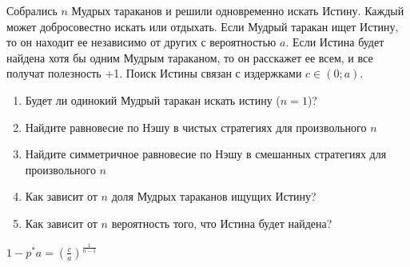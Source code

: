 \begin{problem}
Собрались $n$ Мудрых тараканов и решили одновременно искать Истину. Каждый может добросовестно искать или отдыхать. Если Мудрый таракан ищет Истину, то он находит ее независимо от других с вероятностью $a$. Если Истина будет найдена хотя бы одним Мудрым тараканом, то он расскажет ее всем, и все получат полезность +1. Поиск Истины связан с издержками $c\in(0;a)$. \par
\begin{enumerate}
\item Будет ли одинокий Мудрый таракан искать истину ($n=1$)? \par
\item Найдите равновесие по Нэшу в чистых стратегиях для произвольного $n$ \par
\item  Найдите симметричное равновесие по Нэшу в смешанных стратегиях для произвольного $n$ \par
\item Как зависит от $n$ доля Мудрых тараканов ищущих Истину? \par
\item Как зависит от $n$ вероятность того, что Истина будет найдена?
\end{enumerate}


\begin{sol}

$1-p^{*}a=\left(\frac{c}{a}\right)^{\frac{1}{n-1}}$
\end{sol}
\end{problem}




